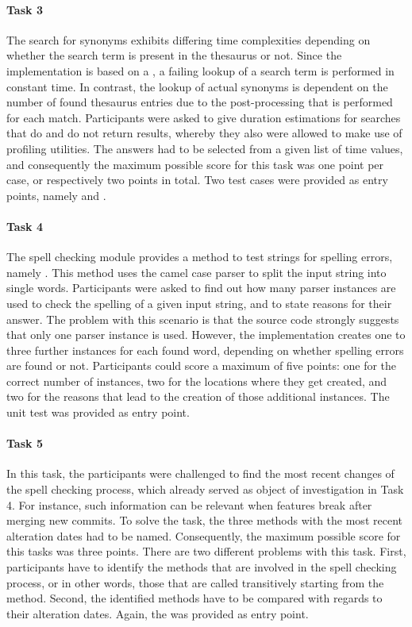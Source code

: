 \paragraph{Task 3} The search for synonyms exhibits differing time complexities depending on whether the search term is present in the thesaurus or not.
Since the implementation is based on a , a failing lookup of a search term is performed in constant time.
In contrast, the lookup of actual synonyms is dependent on the number of found thesaurus entries due to the post-processing that is performed for each match.
Participants were asked to give duration estimations for searches that do and do not return results, whereby they also were allowed to make use of profiling utilities.
The answers had to be selected from a given list of time values, and consequently the maximum possible score for this task was one point per case, or respectively two points in total.
Two test cases were provided as entry points, namely  and .

\paragraph{Task 4} The spell checking module provides a method to test strings for spelling errors, namely .
This method uses the camel case parser to split the input string into single words.
Participants were asked to find out how many parser instances are used to check the spelling of a given input string, and to state reasons for their answer.
The problem with this scenario is that the source code strongly suggests that only one parser instance is used.
However, the implementation creates one to three further instances for each found word, depending on whether spelling errors are found or not.
Participants could score a maximum of five points: one for the correct number of instances, two for the locations where they get created, and two for the reasons that lead to the creation of those additional instances.
The unit test  was provided as entry point.

\paragraph{Task 5} In this task, the participants were challenged to find the most recent changes of the spell checking process, which already served as object of investigation in Task 4.
For instance, such information can be relevant when features break after merging new commits.
To solve the task, the three methods with the most recent alteration dates had to be named.
Consequently, the maximum possible score for this tasks was three points.
There are two different problems with this task.
First, participants have to identify the methods that are involved in the spell checking process, or in other words, those that are called transitively starting from the  method.
Second, the identified methods have to be compared with regards to their alteration dates.
Again, the  was provided as entry point.

